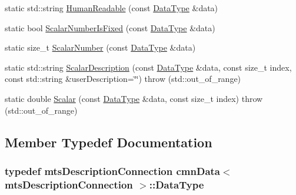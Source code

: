 \begin{DoxyCompactItemize}
\item 
static std\-::string \hyperlink{classcmn_data_3_01mts_description_connection_01_4_a33941d5eb332171110836f8eca39f43b}{Human\-Readable} (const \hyperlink{classcmn_data_3_01mts_description_connection_01_4_ab5515cf136f07ae656b44ade675282a9}{Data\-Type} \&data)
\item 
static bool \hyperlink{classcmn_data_3_01mts_description_connection_01_4_af5f3939c268708bed21144c50eccbfe8}{Scalar\-Number\-Is\-Fixed} (const \hyperlink{classcmn_data_3_01mts_description_connection_01_4_ab5515cf136f07ae656b44ade675282a9}{Data\-Type} \&data)
\item 
static size\-\_\-t \hyperlink{classcmn_data_3_01mts_description_connection_01_4_a2e8e2761a6dff74abc7675eb3fee8c54}{Scalar\-Number} (const \hyperlink{classcmn_data_3_01mts_description_connection_01_4_ab5515cf136f07ae656b44ade675282a9}{Data\-Type} \&data)
\item 
static std\-::string \hyperlink{classcmn_data_3_01mts_description_connection_01_4_a3e9a5fc18c1c27514a9cd3a3731fa07f}{Scalar\-Description} (const \hyperlink{classcmn_data_3_01mts_description_connection_01_4_ab5515cf136f07ae656b44ade675282a9}{Data\-Type} \&data, const size\-\_\-t index, const std\-::string \&user\-Description=\char`\"{}\char`\"{})  throw (std\-::out\-\_\-of\-\_\-range)
\item 
static double \hyperlink{classcmn_data_3_01mts_description_connection_01_4_a0694e8b669097064d4857b402bb2a11b}{Scalar} (const \hyperlink{classcmn_data_3_01mts_description_connection_01_4_ab5515cf136f07ae656b44ade675282a9}{Data\-Type} \&data, const size\-\_\-t index)  throw (std\-::out\-\_\-of\-\_\-range)
\end{DoxyCompactItemize}


\subsection{Member Typedef Documentation}
\hypertarget{classcmn_data_3_01mts_description_connection_01_4_ab5515cf136f07ae656b44ade675282a9}{
\subsubsection[{Data\-Type}]{\setlength{\rightskip}{0pt plus 5cm}typedef {\bf mts\-Description\-Connection} {\bf cmn\-Data}$<$ {\bf mts\-Description\-Connection} $>$\-::{\bf Data\-Type}}}\label{classcmn_data_3_01mts_description_connection_01_4_ab5515cf136f07ae656b44ade675282a9}


